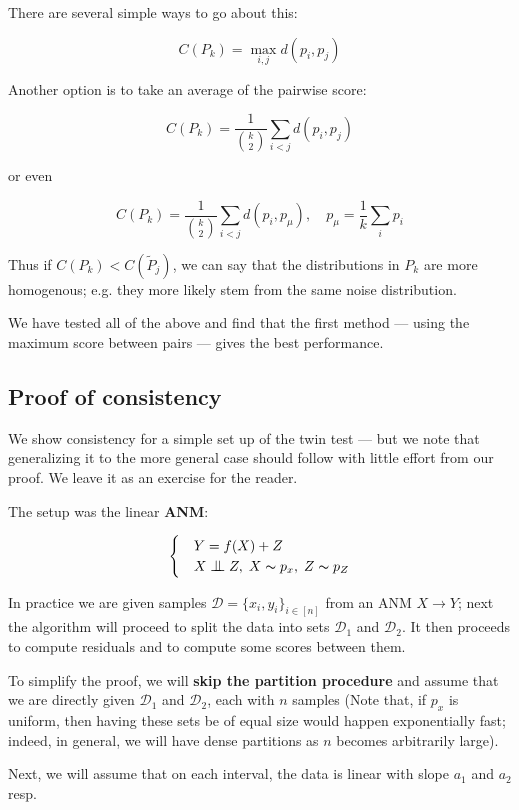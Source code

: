 There are several simple ways to go about this:

$$
    C(P_k) = \operatorname{max}_{i, j} d(p_i, p_j)
$$

Another option is to take an average of the pairwise score:

$$
    C(P_k) = \frac{1}{\binom{k}{2}} \sum_{i < j} d(p_i, p_j)
$$

or even 

$$
    C(P_k) = \frac{1}{\binom{k}{2}} \sum_{i < j} d(p_i, p_\mu)
    , \quad p_\mu = \frac{1}{k} \sum_i p_i
$$


Thus if $C(P_k) < C(\tilde{P}_j)$, we can say that the distributions in $P_k$ are
more homogenous; e.g. they more likely stem from the same noise distribution. 

We have tested all of the above and find that the first method ---  using the maximum score between pairs ---
gives the best performance.




\subsection{Proof of consistency}

We show consistency for a simple set up of the twin test ---  but we note that generalizing it to the more 
general case should follow with little effort from our proof. We leave it as an exercise for the reader. 


The setup was the linear \textbf{ANM}:

\[ \begin{cases} 
    & Y = f(X) + Z  \\
    & X \bigCI Z,\; X \thicksim p_x,\; Z \thicksim p_{Z}  
 \end{cases}
\]

In practice we are given samples $\mathcal{D} = \{x_i, y_i\}_{i \in [n]}$ from an ANM $X \rightarrow Y$; next 
the algorithm will proceed to split the data into sets $\mathcal{D}_1$ and $\mathcal{D}_2$. It then proceeds 
to compute residuals and to compute some scores between them.

To simplify the proof, we will \textbf{skip the partition procedure} and assume that
we are directly given $\mathcal{D}_1$ and $\mathcal{D}_2$, each with 
$n$ samples (Note that, if $p_x$ is uniform, then having these sets be of equal size would happen exponentially 
fast; indeed, in general, we will have dense partitions as $n$ becomes arbitrarily large). 

Next, we will assume that on each interval, the data is linear with slope $a_1$ and $a_2$ resp. 

